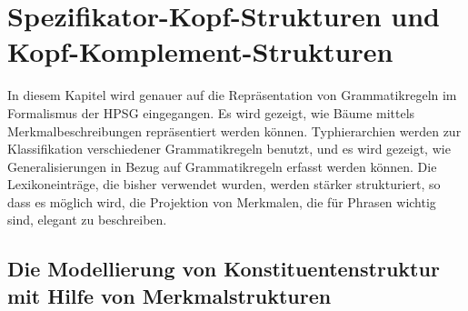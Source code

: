 

\chapter{Spezifikator-Kopf-Strukturen und Kopf-Komplement-Strukturen}
\label{chap-komplementation}

In diesem Kapitel wird genauer auf die Repräsentation von Grammatikregeln
im Formalismus der HPSG eingegangen. Es wird gezeigt, wie Bäume mittels Merkmalbeschreibungen
repräsentiert werden können. Typhierarchien werden zur Klassifikation verschiedener
Grammatikregeln benutzt, und es wird gezeigt, wie Generalisierungen in Bezug
auf Grammatikregeln erfasst werden können. Die Lexikoneinträge, die bisher verwendet wurden,
werden stärker strukturiert, so dass es möglich wird, die Projektion
von Merkmalen, die für Phrasen wichtig sind, elegant zu beschreiben. 

\section{Die Modellierung von Konstituentenstruktur mit Hilfe von Merkmalstrukturen}

